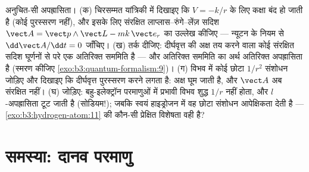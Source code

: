 \begin{exercise}[$\star\star\star$]\label{exo:b3:hydrogen-atom:12}
अनुचित-सी अपह्रासिता। (क) चिरसम्मत यांत्रिकी में दिखाइए कि
$V = -k/r$ के लिए कक्षा बंद हो जाती है (कोई पुरस्सरण नहीं), और इसके
लिए संरक्षित लाप्लास--रुंगे--लेंज़ सदिश $\vect A = \vect p\wedge\vect
L - mk\,\vect e_r$ का उल्लेख कीजिए --- न्यूटन के नियम से
$\dd\vect A/\dd t = 0$ जाँचिए। (ख) तर्क दीजिए: दीर्घवृत्त की अक्ष तय
करने वाला कोई संरक्षित सदिश घूर्णनों से परे एक अतिरिक्त सममिति है ---
और अतिरिक्त सममिति का अर्थ अतिरिक्त अपह्रासिता है (स्मरण कीजिए
\cref{exo:b3:quantum-formalism:9})। (ग) विभव में कोई छोटा
$1/r^2$ संशोधन जोड़िए और दिखाइए कि दीर्घवृत्त
पुरस्सरण करने लगता है: अक्ष घूम जाती है, और $\vect A$ अब संरक्षित नहीं। (घ)
जोड़िए: बहु-इलेक्ट्रॉन परमाणुओं में प्रभावी विभव शुद्ध $1/r$ नहीं
होता, और $l$-अपह्रासिता टूट जाती है (सोडियम!); जबकि स्वयं हाइड्रोजन
में वह छोटा संशोधन आपेक्षिकता देती है --- \cref{exo:b3:hydrogen-atom:11}
की कौन-सी प्रेक्षित विशेषता वही है?
\end{exercise}

\section{समस्या: दानव परमाणु}

